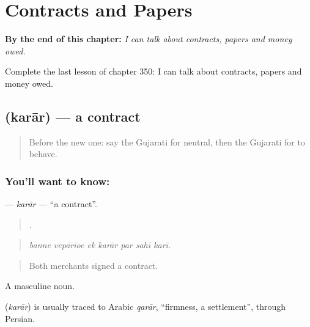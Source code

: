 
\chapter{Contracts and Papers}
\label{ch:gu-contracts-and-papers}

\begin{chapteropening}
\textbf{By the end of this chapter:} \emph{I can talk about contracts, papers and money owed.}

Complete the last lesson of chapter 350: I can talk about contracts, papers and money owed.
\end{chapteropening}

\section[\texorpdfstring{\gu{કરાર} (karār)}{કરાર (karār)}]{ (karār) — a contract}

\label{lesson:GU-C350-karar}



\begin{quote}
Before the new one: say the Gujarati for neutral, then the Gujarati for to behave.
\end{quote}

\subsection*{You'll want to know: }
\textbf{} — \emph{karār} — \textquotedblleft{}a contract\textquotedblright{}.

\begin{quote}
      .
\end{quote}

\begin{quote}
\emph{banne vepārīoe ek karār par sahī karī.}
\end{quote}

\begin{quote}
Both merchants signed a contract.
\end{quote}

A masculine noun.

\begin{cousinweb}
\textbf{} (\emph{karār}) is usually traced to Arabic \emph{qarār}, \textquotedblleft{}firmness, a settlement\textquotedblright{}, through Persian.
\end{cousinweb}


